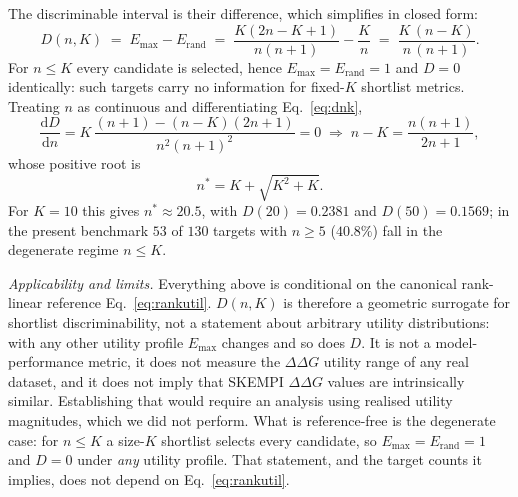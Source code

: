 \documentclass[11pt,a4paper]{article}
\begin{document}
The discriminable interval is their difference, which simplifies in closed form:
\begin{equation}
  D(n,K) \;=\; E_{\max} - E_{\mathrm{rand}}
  \;=\; \frac{K(2n-K+1)}{n(n+1)} - \frac{K}{n}
  \;=\; \frac{K\,(n-K)}{n\,(n+1)} .
  \label{eq:dnk}
\end{equation}
For $n \leq K$ every candidate is selected, hence $E_{\max} = E_{\mathrm{rand}} = 1$ and
$D = 0$ identically: such targets carry no information for fixed-$K$ shortlist metrics.
Treating $n$ as continuous and differentiating Eq.~\eqref{eq:dnk},
\begin{equation}
  \frac{\mathrm{d}D}{\mathrm{d}n}
  = K\,\frac{(n+1) - (n-K)(2n+1)}{n^{2}(n+1)^{2}} = 0
  \;\Longrightarrow\; n - K = \frac{n(n+1)}{2n+1},
\end{equation}
whose positive root is
\begin{equation}
  n^{*} = K + \sqrt{K^{2} + K} .
  \label{eq:nstar2}
\end{equation}
For $K = 10$ this gives $n^{*} \approx 20.5$, with $D(20) = 0.2381$ and
$D(50) = 0.1569$; in the present benchmark $53$ of $130$ targets with $n \geq 5$ ($40.8\%$)
fall in the degenerate regime $n \leq K$.

\emph{Applicability and limits.} Everything above is conditional on the canonical
rank-linear reference Eq.~\eqref{eq:rankutil}. $D(n,K)$ is therefore a geometric
surrogate for shortlist discriminability, not a statement about arbitrary utility
distributions: with any other utility profile $E_{\max}$ changes and so does $D$.
It is not a model-performance metric, it does not measure the $\Delta\Delta G$ utility range
of any real dataset, and it does not imply that SKEMPI $\Delta\Delta G$ values are
intrinsically similar. Establishing that would require an analysis using realised utility
magnitudes, which we did not perform. What is reference-free is the degenerate case: for
$n \leq K$ a size-$K$ shortlist selects every candidate, so $E_{\max} = E_{\mathrm{rand}} = 1$
and $D = 0$ under \emph{any} utility profile. That statement, and the target counts it
implies, does not depend on Eq.~\eqref{eq:rankutil}.
\end{document}
